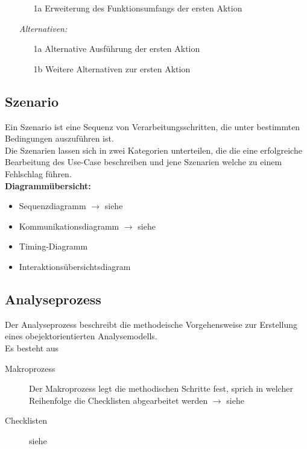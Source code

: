 \begin{description}[leftmargin=2cm]
\begin{itemize}[leftmargin=4cm]
\begin{enumerate}[leftmargin=0.5cm]
            \item[1a] Erweiterung des Funktionsumfangs der ersten Aktion
          \end{enumerate}
        \item[\textit{Alternativen:}]
          \begin{enumerate}[leftmargin=0.5cm]
            \item[1a] Alternative Ausführung der ersten Aktion
            \item[1b] Weitere Alternativen zur ersten Aktion
          \end{enumerate}
        \item[\Balzert{68}]
      \end{itemize}
	\end{description}


\subsection{Szenario }
  Ein Szenario ist eine Sequenz von Verarbeitungsschritten, die unter bestimmten
  Bedingungen auszuführen ist.\\
  Die Szenarien lassen sich in zwei Kategorien unterteilen, die die eine erfolgreiche Bearbeitung
  des Use-Case beschreiben und jene Szenarien welche zu einem Fehlschlag führen. \\
  
  \textbf{Diagrammübersicht:}
  \begin{itemize}[leftmargin=0.5cm]
    \item Sequenzdiagramm $\rightarrow$ siehe 
    \item Kommunikationsdiagramm $\rightarrow$ siehe 
    \item Timing-Diagramm
    \item Interaktionsübersichtsdiagram
  \end{itemize}
  
\subsection{Analyseprozess }
  Der Analyseprozess beschreibt die methodeische Vorgehensweise zur Erstellung eines
  obejektorientierten Analysemodells.\\
  
  Es besteht aus
  \begin{description}
    \item[Makroprozess]
      Der Makroprozess legt die methodischen Schritte fest, sprich in welcher
      Reihenfolge die Checklisten abgearbeitet werden $\rightarrow$ siehe 
    \item[Checklisten]
      siehe 
  \end{description}
  
  